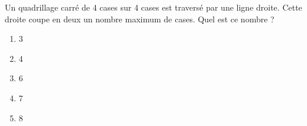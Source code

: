  Un quadrillage carré de 4 cases sur 4 cases est traversé par une ligne droite. Cette droite
coupe en deux un nombre maximum de cases. Quel est ce nombre ?
\begin{multicols}{5}
  \begin{enumerate}[A/]
  \item 3
  \item 4
  \item 6
  \item 7
  \item 8
  \end{enumerate}
\end{multicols}